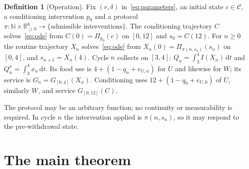 \documentclass[11pt,a4paper]{article}
\theoremstyle{plain}
\theoremstyle{definition}
\newtheorem{definition}[theorem]{Definition}
\theoremstyle{remark}
\newcommand{\R}{\mathbb R}
\newcommand{\N}{\mathbb N}
\newcommand{\dd}{\,\mathrm d}
\newcommand{\Adm}{\mathcal C}
\newcommand{\Pulse}{\Pi}
\newcommand{\Iv}{I}
\begin{document}
\begin{definition}[Operation]\label{def:operation}
Fix $(r,\delta)$ in~\eqref{eq:parameters}, an initial state $c\in\Adm$, a conditioning intervention $p_0$ and a protocol $\pi:\N\times\R^6_{\ge0}\to\{\text{admissible interventions}\}$. The conditioning trajectory $C$ solves~\eqref{eq:ode} from $C(0)=\Pulse_{p_0}(c)$ on $[0,12]$ and $s_0=C(12)$. For $n\ge0$ the routine trajectory $X_n$ solves~\eqref{eq:ode} from $X_n(0)=\Pulse_{\pi(n,s_n)}(s_n)$ on $[0,4]$, and $s_{n+1}=X_n(4)$. Cycle $n$ collects on $[3,4]$: $Q_n=\int_3^4\Iv(X_n)\dd t$ and $Q^{x}_n=\int_3^4x_n\dd t$. Its food use is $4+(1-q_n+e_{U,n})$ for $U$ and likewise for $W$; its service is $G_n=G_{[0,4]}(X_n)$. Conditioning uses $12+(1-q_0+e_{U,0})$ of $U$, similarly $W$, and service $G_{[0,12]}(C)$.
\end{definition}
The protocol may be an arbitrary function; no continuity or measurability is required. In cycle $n$ the intervention applied is $\pi(n,s_n)$, so it may respond to the pre-withdrawal state.

\section{The main theorem}\label{sec:main}
\end{document}
